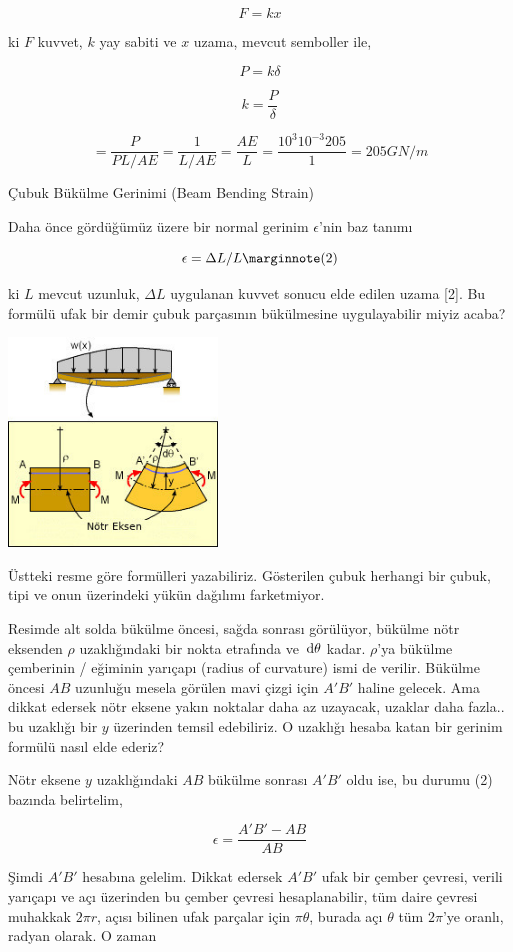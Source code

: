 \documentclass[12pt,fleqn]{article}\usepackage{../../common}
\begin{document}
$$
F = k x
$$

ki $F$ kuvvet, $k$ yay sabiti ve $x$ uzama, mevcut semboller ile,

$$
P = k \delta
$$

$$
k = \frac{P}{\delta}
$$

$$
= \frac{P}{PL / AE} = \frac{1}{L / AE} = \frac{AE}{L} =
\frac{10^3 10^{-3} 205}{1} =
205 GN/m
$$

Çubuk Bükülme Gerinimi (Beam Bending Strain)

Daha önce gördüğümüz üzere bir normal gerinim $\epsilon$'nin baz tanımı

$$
\epsilon = \Delta L / L
\mlabel{2}
$$

ki $L$ mevcut uzunluk, $\Delta L$ uygulanan kuvvet sonucu elde edilen uzama [2].
Bu formülü ufak bir demir çubuk parçasının bükülmesine uygulayabilir miyiz
acaba? 

\includegraphics[width=15em]{phy_020_strs_00_03.jpg}

Üstteki resme göre formülleri yazabiliriz. Gösterilen çubuk herhangi bir
çubuk, tipi ve onun üzerindeki yükün dağılımı farketmiyor.

Resimde alt solda bükülme öncesi, sağda sonrası görülüyor, bükülme nötr eksenden
$\rho$ uzaklığındaki bir nokta etrafında ve $\,\mathrm{d}\theta$ kadar. $\rho$'ya bükülme
çemberinin / eğiminin yarıçapı (radius of curvature) ismi de verilir. Bükülme
öncesi $AB$ uzunluğu mesela görülen mavi çizgi için $A'B'$ haline gelecek. Ama
dikkat edersek nötr eksene yakın noktalar daha az uzayacak, uzaklar daha
fazla.. bu uzaklığı bir $y$ üzerinden temsil edebiliriz. O uzaklığı hesaba katan
bir gerinim formülü nasıl elde ederiz?

Nötr eksene $y$ uzaklığındaki $AB$ bükülme sonrası $A'B'$ oldu ise, bu durumu
(2) bazında belirtelim,

$$
\epsilon = \frac{A'B' - AB}{AB}
$$

Şimdi $A'B'$ hesabına gelelim. Dikkat edersek $A'B'$ ufak bir çember çevresi,
verili yarıçapı ve açı üzerinden bu çember çevresi hesaplanabilir, tüm daire
çevresi muhakkak $2 \pi r$, açısı bilinen ufak parçalar için $\pi \theta$,
burada açı $\theta$ tüm $2 \pi$'ye oranlı, radyan olarak. O zaman
\end{document}
